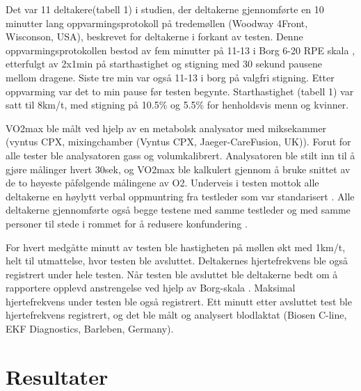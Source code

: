 \documentclass[
]{book}
\begin{document}
Det var 11 deltakere(tabell 1) i studien, der deltakerne gjennomførte en 10 minutter lang oppvarmingsprotokoll på tredemøllen (Woodway 4Front, Wisconson, USA), beskrevet for deltakerne i forkant av testen. Denne oppvarmingsprotokollen bestod av fem minutter på 11-13 i Borg 6-20 RPE skala \citep{borg1982}, etterfulgt av 2x1min på starthastighet og stigning med 30 sekund pausene mellom dragene. Siste tre min var også 11-13 i borg på valgfri stigning. Etter oppvarming var det to min pause før testen begynte. Starthastighet (tabell 1) var satt til 8km/t, med stigning på 10.5\% og 5.5\% for henholdsvis menn og kvinner.

VO2max ble målt ved hjelp av en metabolsk analysator med miksekammer (vyntus CPX, mixing­chamber (Vyntus CPX, Jaeger-CareFusion, UK)). Forut for alle tester ble analysatoren gass og volumkalibrert. Analysatoren ble stilt inn til å gjøre målinger hvert 30sek, og VO2max ble kalkulert gjennom å bruke snittet av de to høyeste påfølgende målingene av O2. Underveis i testen mottok alle deltakerne en høylytt verbal oppmuntring fra testleder som var standarisert \citep{halperin2015}. Alle deltakerne gjennomførte også begge testene med samme testleder og med samme personer til stede i rommet for å redusere konfundering \citep{halperin2015}.

For hvert medgåtte minutt av testen ble hastigheten på møllen økt med 1km/t, helt til utmattelse, hvor testen ble avsluttet. Deltakernes hjertefrekvens ble også registrert under hele testen. Når testen ble avsluttet ble deltakerne bedt om å rapportere opplevd anstrengelse ved hjelp av Borg-skala \citep{borg1982}. Maksimal hjertefrekvens under testen ble også registrert. Ett minutt etter avsluttet test ble hjertefrekvens registrert, og det ble målt og analysert blodlaktat (Biosen C-line, EKF Diagnostics, Barleben, Germany).

\hypertarget{resultater}{%
\section{Resultater}\label{resultater}}

\providecommand{\docline}[3]{\noalign{\global\setlength{\arrayrulewidth}{#1}}\arrayrulecolor[HTML]{#2}\cline{#3}}

\setlength{\tabcolsep}{2pt}

\renewcommand*{\arraystretch}{1.5}
\end{document}
